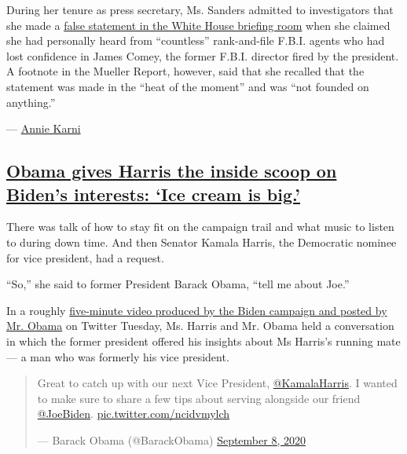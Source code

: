 During her tenure as press secretary, Ms. Sanders admitted to
investigators that she made a
\href{https://www.nytimes3xbfgragh.onion/2019/04/19/us/politics/sarah-sanders-mueller-report.html}{false
statement in the White House briefing room} when she claimed she had
personally heard from ``countless'' rank-and-file F.B.I. agents who had
lost confidence in James Comey, the former F.B.I. director fired by the
president. A footnote in the Mueller Report, however, said that she
recalled that the statement was made in the ``heat of the moment'' and
was ``not founded on anything.''

--- \href{https://www.nytimes3xbfgragh.onion/by/annie-karni}{Annie
Karni}

\hypertarget{obama-gives-harris-the-inside-scoop-on-bidens-interests-ice-cream-is-big}{%
\subsection{\texorpdfstring{\protect\hyperlink{obama-gives-harris-the-inside-scoop-on-bidens-interests-ice-cream-is-big}{Obama
gives Harris the inside scoop on Biden's interests: `Ice cream is
big.'}}{Obama gives Harris the inside scoop on Biden's interests: `Ice cream is big.'}}\label{obama-gives-harris-the-inside-scoop-on-bidens-interests-ice-cream-is-big}}

There was talk of how to stay fit on the campaign trail and what music
to listen to during down time. And then Senator Kamala Harris, the
Democratic nominee for vice president, had a request.

``So,'' she said to former President Barack Obama, ``tell me about
Joe.''

In a roughly
\href{https://twitter.com/BarackObama/status/1303302067847663617}{five-minute
video produced by the Biden campaign and posted by Mr. Obama} on Twitter
Tuesday, Ms. Harris and Mr. Obama held a conversation in which the
former president offered his insights about Ms Harris's running mate ---
a man who was formerly his vice president.

\begin{quote}
Great to catch up with our next Vice President,
\href{https://twitter.com/KamalaHarris?ref_src=twsrc\%5Etfw}{@KamalaHarris}.
I wanted to make sure to share a few tips about serving alongside our
friend
\href{https://twitter.com/JoeBiden?ref_src=twsrc\%5Etfw}{@JoeBiden}.
\href{https://t.co/ncidvmylch}{pic.twitter.com/ncidvmylch}

--- Barack Obama (@BarackObama)
\href{https://twitter.com/BarackObama/status/1303302067847663617?ref_src=twsrc\%5Etfw}{September
8, 2020}
\end{quote}

